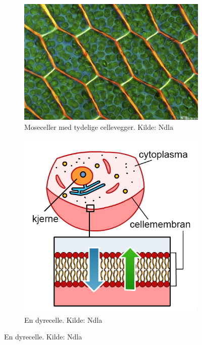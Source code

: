 \documentclass[main.tex]{subfiles}
\begin{document}
\begin{figure}[h!]
\centering
    \begin{subfigure}{.5\textwidth}
    \centering
    \includegraphics[scale = 0.5]{../figures/cellevegg.jpg}
    \caption{Moseceller med tydelige cellevegger. Kilde: Ndla}
    \end{subfigure}%
    \begin{subfigure}{.5\textwidth}
    \centering
    \includegraphics[scale = 0.25]{../figures/cellemembran.jpg}
    \caption{En dyrecelle. Kilde: Ndla}
    \end{subfigure}

\end{figure}
\end{document}
